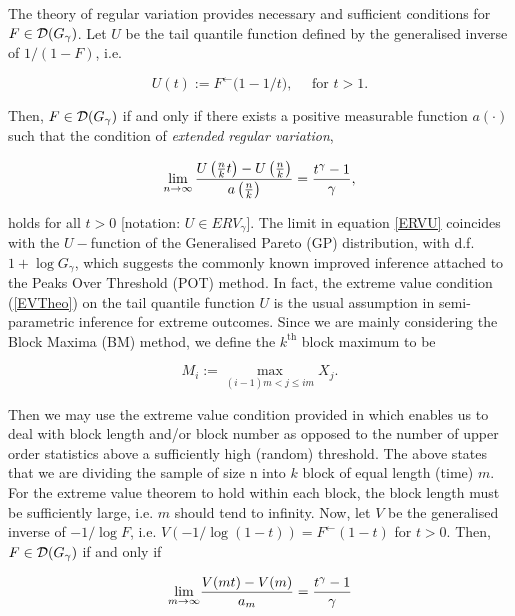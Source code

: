 The theory of regular variation \citep{Binghametal:87,deHaan:70, deHF:06} provides necessary and sufficient conditions for $F\in {\ensuremath{\mathcal{D}}}(G_{\gamma})$. Let $U$ be the tail quantile function defined by the generalised inverse of $1/(1-F)$, i.e.


\begin{equation*}
U(t):=   F^{\leftarrow} \bigl( 1-1/t\bigr), \quad \mbox{ for } t >  1.
\end{equation*}


Then, $F\in {\ensuremath{\mathcal{D}}}(G_{\gamma})$ if and only if there exists a positive  measurable function $a(\cdot)$ such that the condition of \emph{extended regular variation},


\begin{equation}\label{ERVU}
	\displaystyle {\lim_{n \rightarrow{\infty}}}\,\frac{U\left(\frac{n}{k}t\right)-U\left(\frac{n}{k}\right)}{a\left(\frac{n}{k}\right)}= \frac{t^{\gamma}-1}{\gamma},
\end{equation}


holds for all $t>0$ [notation: $U\in ERV_{\gamma}$]. The limit in equation \ref{ERVU} coincides with the $U-$function of the Generalised Pareto (GP) distribution, with d.f. $ 1+ \log G_ \gamma $, which suggests the commonly known improved inference attached to the Peaks Over Threshold (POT) method. In fact, the extreme value condition (\ref{EVTheo}) on the tail quantile function $ U $ is the usual assumption in semi-parametric inference for extreme outcomes. Since we are mainly considering the Block Maxima (BM) method, we define the $ k^{\text{th}} $ block maximum to be

\begin{equation}
M_i := \max _{(i -1) m < j \le i m} X_j.
\end{equation}

\noindent Then we may use the extreme value condition provided in \citet{FdeH:15} which enables us to deal with block length and/or block number as opposed to the number of upper order statistics above a sufficiently high (random) threshold. The above states that we are dividing the sample of size n into $k$ block of equal length (time) $m$. For the extreme value theorem to hold within each block, the block length must be sufficiently large, i.e. $m$ should tend to infinity. Now, let $V$ be the generalised inverse of $ -1/\log F $, i.e. $ V(-1 / \log( 1 - t ) ) = F^{\leftarrow}( 1 - t )$ for $ t > 0 $. Then, $F \in {\ensuremath{\mathcal{D}}} ( G_\gamma )$ if and only if


\begin{equation} \label{EVTheo2}
\displaystyle {\lim_{m \rightarrow{\infty}}} \frac{V(mt) - V(m)}{a_m} = \frac{t^\gamma - 1}{\gamma}
\end{equation}


